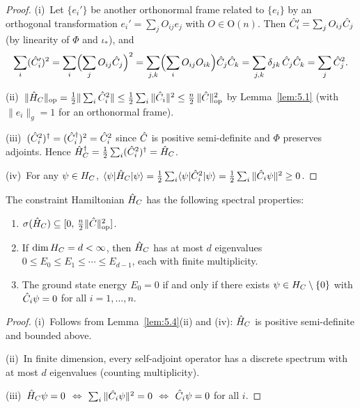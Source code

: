 \begin{proof}
(i)~Let $\{e_i'\}$ be another orthonormal frame related to $\{e_i\}$ by
an orthogonal transformation $e_i' = \sum_j O_{ij} e_j$ with
$O \in \mathrm{O}(n)$.  Then $\hat{C}_i' = \sum_j O_{ij} \hat{C}_j$ (by
linearity of $\Phi$ and $\iota_*$), and
\[
  \sum_i (\hat{C}_i')^2
  = \sum_i \Bigl(\sum_j O_{ij}\hat{C}_j\Bigr)^2
  = \sum_{j,k} \Bigl(\sum_i O_{ij}O_{ik}\Bigr) \hat{C}_j\hat{C}_k
  = \sum_{j,k} \delta_{jk}\,\hat{C}_j\hat{C}_k
  = \sum_j \hat{C}_j^2.
\]

(ii)~$\|\hat{H}_C\|_{\mathrm{op}} = \frac{1}{2}\|\sum_i \hat{C}_i^2\|
\leq \frac{1}{2}\sum_i \|\hat{C}_i\|^2
\leq \frac{n}{2}\,\|\hat{C}\|_{\mathrm{op}}^2$ by Lemma~\ref{lem:5.1}
(with $\|e_i\|_g = 1$ for an orthonormal frame).

(iii)~$(\hat{C}_i^2)^\dagger = (\hat{C}_i^\dagger)^2 = \hat{C}_i^2$ since
$\hat{C}$ is positive semi-definite and $\Phi$ preserves adjoints.
Hence $\hat{H}_C^\dagger = \frac{1}{2}\sum_i (\hat{C}_i^2)^\dagger
= \hat{H}_C$.

(iv)~For any $\psi \in H_C$,
$\langle\psi|\hat{H}_C|\psi\rangle
= \frac{1}{2}\sum_i \langle\psi|\hat{C}_i^2|\psi\rangle
= \frac{1}{2}\sum_i \|\hat{C}_i\psi\|^2 \geq 0$.
\end{proof}

\begin{proposition}
\label{prop:5.2}
The constraint Hamiltonian $\hat{H}_C$ has the following spectral
properties:
\begin{enumerate}
  \item[\textup{(i)}] $\sigma(\hat{H}_C) \subseteq
    [0,\, \frac{n}{2}\|\hat{C}\|_{\mathrm{op}}^2]$.
  \item[\textup{(ii)}] If $\dim H_C = d < \infty$, then $\hat{H}_C$ has
    at most $d$ eigenvalues $0 \leq E_0 \leq E_1 \leq \cdots \leq
    E_{d-1}$, each with finite multiplicity.
  \item[\textup{(iii)}] The ground state energy $E_0 = 0$ if and only if
    there exists $\psi \in H_C \setminus \{0\}$ with
    $\hat{C}_i \psi = 0$ for all $i = 1, \ldots, n$.
\end{enumerate}
\end{proposition}

\begin{proof}
(i)~Follows from Lemma~\ref{lem:5.4}(ii) and (iv): $\hat{H}_C$ is
positive semi-definite and bounded above.

(ii)~In finite dimension, every self-adjoint operator has a discrete
spectrum with at most $d$ eigenvalues (counting multiplicity).

(iii)~$\hat{H}_C\psi = 0$ $\iff$ $\sum_i \|\hat{C}_i\psi\|^2 = 0$ $\iff$
$\hat{C}_i\psi = 0$ for all $i$.
\end{proof}

